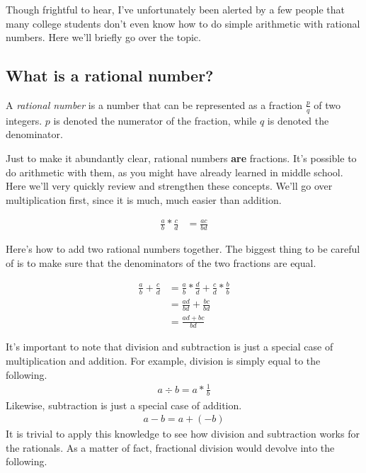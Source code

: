 Though frightful to hear, I've unfortunately been alerted by a few people that many college students don't even know how to do simple arithmetic with rational numbers. Here we'll briefly go over the topic.

\subsection{What is a rational number?}

\begin{definition}
A \textit{rational number} is a number that can be represented as a fraction $\frac{p}{q}$ of two integers. $p$ is denoted the numerator of the fraction, while $q$ is denoted the denominator. 
\end{definition}

Just to make it abundantly clear, rational numbers \textbf{are} fractions. It's possible to do arithmetic with them, as you might have already learned in middle school. Here we'll very quickly review and strengthen these concepts. We'll go over multiplication first, since it is much, much easier than addition.

\begin{align*}
    \frac{a}{b} * \frac{c}{d} &= \frac{ac}{bd}
\end{align*}

Here's how to add two rational numbers together. The biggest thing to be careful of is to make sure that the denominators of the two fractions are equal.

\begin{align*}
    \frac{a}{b} + \frac{c}{d} &= \frac{a}{b} * \frac{d}{d} + \frac{c}{d} * \frac{b}{b}\\
    &= \frac{ad}{bd} + \frac{bc}{bd}\\
    &= \frac{ad + bc}{bd}
\end{align*}

It's important to note that division and subtraction is just a special case of multiplication and addition. For example, division is simply equal to the following.
\begin{align*}
    a \div b = a * \frac{1}{b}
\end{align*}
Likewise, subtraction is just a special case of addition.
\begin{align*}
    a - b = a + (-b)
\end{align*}
It is trivial to apply this knowledge to see how division and subtraction works for the rationals. As a matter of fact, fractional division would devolve into the following.

